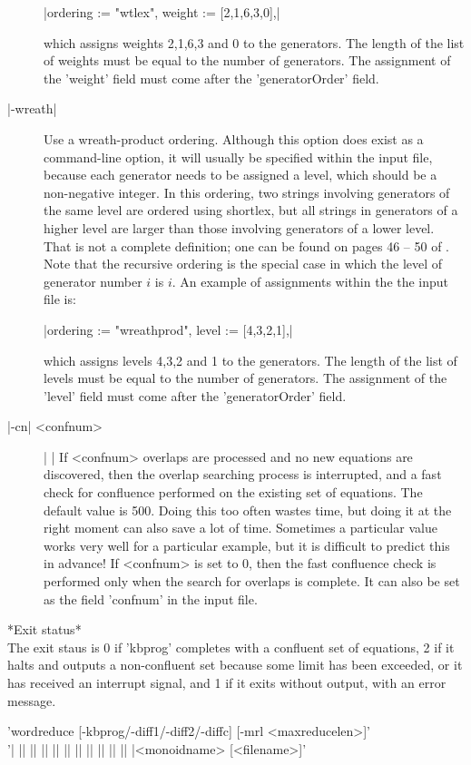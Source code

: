 \begin{description}
|ordering := "wtlex", weight := [2,1,6,3,0],|

which assigns weights 2,1,6,3 and 0 to the generators. The length of the
list of weights must be equal to the number of generators. The assignment
of the 'weight' field must come after the 'generatorOrder' field.
\item[|-wreath|]
Use a wreath-product ordering.
Although this option does exist as a command-line option, it will usually
be specified within the input file, because each generator needs to be
assigned a level, which should be a non-negative integer.
In this ordering, two strings involving generators of the same level are
ordered using shortlex, but all strings in generators of a higher level are
larger than those involving generators of a lower level. That is not a
complete definition; one can be found  on pages 46 -- 50 of \cite{Sims94}.
Note that the recursive ordering is the special case in which the level
of generator number $i$ is $i$.
An example of assignments within the the input file is:

|ordering := "wreathprod", level := [4,3,2,1],|

which assigns levels 4,3,2 and 1 to the generators. The length of the
list of levels must be equal to the number of generators. The assignment
of the 'level' field must come after the 'generatorOrder' field.
\item[|-cn| <confnum>] | |\newline
If <confnum> overlaps are processed and no new equations are discovered, then
the overlap searching process is interrupted, and a fast check for
confluence performed on the existing set of equations.
The default value is 500. Doing this too often wastes time, but doing it
at the right moment can also save a lot of time. Sometimes a particular
value works very well for a particular example, but it is difficult
to predict this in advance! If <confnum> is set to 0, then the fast
confluence check is performed only when the search for overlaps is
complete.
It can also be set as the field 'confnum' in the input file.
\end{description}

*Exit status*\\
The exit staus is 0 if 'kbprog' completes with a confluent set of equations,
2 if it halts and outputs a non-confluent set because some limit has
been exceeded, or it has received an interrupt signal, and 1 if it exits
without output, with an error message.

'wordreduce  [-kbprog/-diff1/-diff2/-diffc] [-mrl <maxreducelen>]'\\ 
'| || || || || || || || || || || |<monoidname> [<filename>]'

